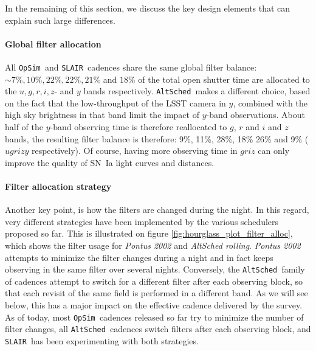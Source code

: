 \documentclass [11pt,a4paper]{article}
\newcommand{\opsim}{{\tt OpSim\ }}
\newcommand{\slair}{{\tt SLAIR\ }}
\newcommand{\altsched}{{\tt AltSched\ }}
\begin{document}
In the remaining of this section, we discuss the key design elements
that can explain such large differences. 


\paragraph{Global filter allocation} All \opsim and \slair cadences   share the same global filter balance: 
$\sim 7\%, 10\%, 22\%, 22\%, 21\%$ and $18\%$ of the total open shutter time
are allocated to the $u, g, r, i, z$- and $y$ bands respectively.
\altsched makes a different choice, based on the fact that the
low-throughput of the LSST camera in $y$, combined with the high sky
brightness in that band limit the impact of $y$-band observations.
About half of the $y$-band observing time is therefore reallocated to
$g$, $r$ and $i$ and $z$ bands, the resulting filter balance is
therefore: 9\%, 11\%, 28\%, 18\% 26\% and 9\% ($ugrizy$ respectively). Of course, having more
observing time in $griz$ can only improve the quality of SN~Ia light curves and distances.


\paragraph{Filter allocation strategy} Another key point, is how the filters are
changed during the night.  In this regard, very different strategies
have been implemented by the various schedulers proposed so far.  This
is illustrated on figure \ref{fig:hourglass_plot_filter_alloc}, which
shows the filter usage for  {\em Pontus 2002} and {\em
  AltSched rolling}.  {\em Pontus 2002} attempts to minimize the
filter changes during a night and in fact keeps observing in the same
filter over several nights.  Conversely, the \altsched family of
cadences attempt to switch for a different filter after each observing
block, so that each revisit of the same field is performed in a
different band.  As we will see below, this has a major impact on the effective cadence
delivered by the survey. As of today, most \opsim cadences released so
far try to minimize the number of filter changes, all \altsched cadences
switch filters after each observing block, and \slair has been
experimenting with both strategies.
\end{document}
